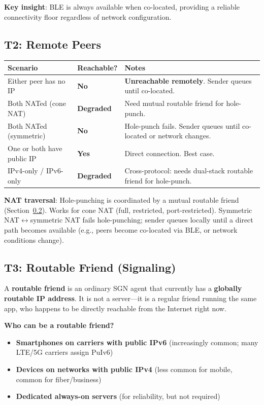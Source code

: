 \documentclass[11pt,a4paper]{article}
\newcommand{\yes}{\textcolor{yes}{\textbf{Yes}}}
\newcommand{\no}{\textcolor{no}{\textbf{No}}}
\newcommand{\dgr}{\textcolor{degraded}{\textbf{Degraded}}}
\begin{document}
\textbf{Key insight}: BLE is always available when co-located, providing a reliable connectivity floor regardless of network configuration.

\subsection{T2: Remote Peers}

\begin{table}[H]
\centering\small
\begin{tabular}{L{4cm} C{2cm} L{5.5cm}}
\toprule
\textbf{Scenario} & \textbf{Reachable?} & \textbf{Notes} \\
\midrule
Either peer has no IP & \no & \textbf{Unreachable remotely}. Sender queues until co-located. \\
Both NATed (cone NAT) & \dgr & Need mutual routable friend for hole-punch. \\
Both NATed (symmetric) & \no & Hole-punch fails. Sender queues until co-located or network changes. \\
One or both have public IP & \yes & Direct connection. Best case. \\
IPv4-only / IPv6-only & \dgr & Cross-protocol: needs dual-stack routable friend for hole-punch. \\
\bottomrule
\end{tabular}
\end{table}

\textbf{NAT traversal}: Hole-punching is coordinated by a mutual routable friend (Section~\ref{sec:routable-friend}). Works for cone NAT (full, restricted, port-restricted). Symmetric NAT$\leftrightarrow$symmetric NAT fails hole-punching; sender queues locally until a direct path becomes available (e.g., peers become co-located via BLE, or network conditions change).

\subsection{T3: Routable Friend (Signaling)}
\label{sec:routable-friend}

A \textbf{routable friend} is an ordinary SGN agent that currently has a \textbf{globally routable IP address}. It is not a server---it is a regular friend running the same app, who happens to be directly reachable from the Internet right now.

\textbf{Who can be a routable friend?}
\begin{itemize}[nosep]
  \item \textbf{Smartphones on carriers with public IPv6} (increasingly common; many LTE/5G carriers assign PuIv6)
  \item \textbf{Devices on networks with public IPv4} (less common for mobile, common for fiber/business)
  \item \textbf{Dedicated always-on servers} (for reliability, but not required)
\end{itemize}
\end{document}
